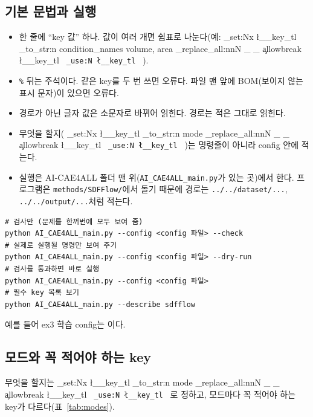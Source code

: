 \documentclass[11pt]{article}
\DeclareRobustCommand{\key}[1]{
  \tl_set:Nx \l__key_tl { \tl_to_str:n {#1} }
  \regex_replace_all:nnN { \_ } { \cO\_ \c{allowbreak} } \l__key_tl
  \texttt{ \tl_use:N \l__key_tl }
}
\begin{document}
\subsection{기본 문법과 실행}

\begin{itemize}
\item 한 줄에 ``key 값'' 하나. 값이 여러 개면 쉼표로 나눈다(예: \key{condition_names volume, area}).
\item \texttt{\%} 뒤는 주석이다. 같은 key를 두 번 쓰면 오류다. 파일 맨 앞에 BOM(보이지 않는 표시 문자)이 있으면 오류다.
\item 경로가 아닌 글자 값은 소문자로 바뀌어 읽힌다. 경로는 적은 그대로 읽힌다.
\item 무엇을 할지(\key{mode})는 명령줄이 아니라 config 안에 적는다.
\item 실행은 AI-CAE4ALL 폴더 맨 위(\texttt{AI\_CAE4ALL\_main.py}가 있는 곳)에서 한다. 프로그램은 \texttt{methods/SDFFlow/}에서 돌기 때문에 경로는
\texttt{../../dataset/...}, \texttt{../../output/...}처럼 적는다.
\end{itemize}

\begin{Verbatim}[fontsize=\small, frame=single, framesep=2mm]
# 검사만 (문제를 한꺼번에 모두 보여 줌)
python AI_CAE4ALL_main.py --config <config 파일> --check
# 실제로 실행될 명령만 보여 주기
python AI_CAE4ALL_main.py --config <config 파일> --dry-run
# 검사를 통과하면 바로 실행
python AI_CAE4ALL_main.py --config <config 파일>
# 필수 key 목록 보기
python AI_CAE4ALL_main.py --describe sdfflow
\end{Verbatim}
\noindent 예를 들어 ex3 학습 config는 이다.

\subsection{모드와 꼭 적어야 하는 key}

무엇을 할지는 \key{mode}로 정하고, 모드마다 꼭 적어야 하는 key가 다르다(표~\ref{tab:modes}).
\end{document}
